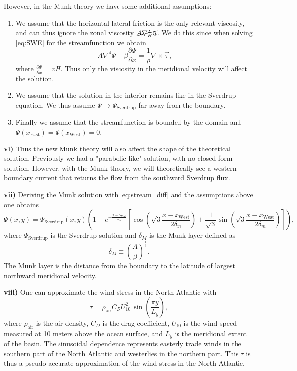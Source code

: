 However, in the Munk theory we have some additional assumptions:
\begin{enumerate}
    \item We assume that the horizontal lateral friction is the only relevant viscosity, and can thus ignore the zonal viscosity $\cancel{A\nabla_H^2u}$. We do this since when solving \autoref{eq:SWE} for the streamfunction we obtain 
    \begin{equation}
        A\nabla^4 \Psi -\beta \frac{\partial \Psi}{\partial x} = \frac{1}{\rho}\nabla\times\vec{\tau},
        \label{eq:stream_diff}
    \end{equation}
    where $\tfrac{\partial \Psi}{\partial x}=vH$. Thus only the viscosity in the meridional velocity will affect the solution.  
    
    \item We assume that the solution in the interior remains like in the Sverdrup equation. We thus assume $\Psi\rightarrow\Psi_\text{Sverdrup}$ far away from the boundary.
    
    \item Finally we assume that the streamfunction is bounded by the domain and $\Psi(x_\text{East})=\Psi(x_\text{West})=0$.
\end{enumerate}

\textbf{vi)} Thus the new Munk theory will also affect the shape of the theoretical solution. Previously we had a "parabolic-like" solution, with no closed form solution. However, with the Munk theory, we will theoretically see a western boundary current that returns the flow from the southward Sverdrup flux.   

\textbf{vii)} Deriving the Munk solution with \autoref{eq:stream_diff} and the assumptions above one obtains
\begin{equation}
    \Psi(x,y)=\Psi_\text{Sverdrup}(x,y)\left(1-e^{-\frac{x-x_\text{West}}{2\delta_m}}\left[\cos\left(\sqrt{3}\frac{x-x_\text{West}}{2\delta_m}\right)+\frac{1}{\sqrt{3}}\sin\left(\sqrt{3}\frac{x-x_\text{West}}{2\delta_m}\right)\right]\right),
\end{equation}
where $\Psi_\text{Sverdrup}$ is the Sverdrup solution and $\delta_M$ is the Munk layer defined as 
\begin{equation}
    \delta_M\equiv\left(\frac{A}{\beta}\right)^{\tfrac{1}{3}}.
\end{equation}
The Munk layer is the distance from the boundary to the latitude of largest northward meridional velocity. 

\textbf{viii)} One can approximate the wind stress in the North Atlantic with 
\begin{equation}
    \tau=\rho_\text{air}C_DU_{10}^2\,\sin\left(\frac{\pi y}{L_y}\right),
\end{equation}
where $\rho_\text{air}$ is the air density, $C_D$ is the drag coefficient, $U_{10}$ is the wind speed measured at 10 meters above the ocean surface, and $L_y$ is the meridional extent of the basin. The sinusoidal dependence represents easterly trade winds in the southern part of the North Atlantic and westerlies in the northern part. This $\tau$ is thus a pseudo accurate approximation of the wind stress in the North Atlantic.